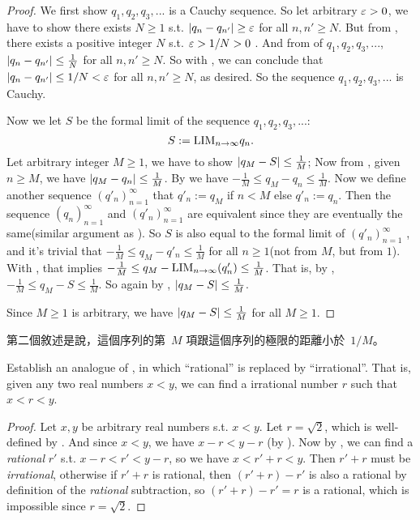 \begin{proof}
We first show \(q_1, q_2, q_3,...\) is a Cauchy sequence.
So let arbitrary \(\varepsilon > 0\), we have to show there exists \(N \ge 1\) s.t. \(\lvert q_n - q_{n'}\rvert \ge \varepsilon\) for all \(n, n' \ge N\).
But from , there exists a positive integer \(N\) s.t. \(\varepsilon > 1/N > 0\) .
And from  of \(q_1, q_2, q_3,...\), \(\lvert q_n - q_{n'}\rvert \le \frac{1}{N}\)  for all \(n, n' \ge N\).
So with , we can conclude that \(\lvert q_n - q_{n'}\rvert \le 1/N < \varepsilon\) for all \(n, n' \ge N\), as desired.
So the sequence \(q_1, q_2, q_3,...\) is Cauchy.

Now we let \(S\) be the formal limit of the sequence \(q_1, q_2, q_3,...\):
\[
    S := \text{LIM}_{n \to \infty} q_n.
\]
Let arbitrary integer \(M \ge 1\), we have to show \(\lvert q_M - S\rvert \le \frac{1}{M}\);
Now from , given \(n \ge M\), we have \(\lvert q_M - q_n\rvert \le \frac{1}{M}\).
By  we have \(-\frac{1}{M} \le q_M - q_n \le \frac{1}{M}\).
Now we define another sequence \((q'_n)_{n = 1}^{\infty}\) that \(q'_n := q_M\) if \(n < M\) else \(q'_n := q_n\).
Then the sequence \((q_n)_{n = 1}^{\infty}\) and \((q'_n)_{n = 1}^{\infty}\) are equivalent since they are eventually the same(similar argument as ).
So \(S\) is also equal to the formal limit of \((q'_n)_{n = 1}^{\infty}\) , and it's trivial that \(-\frac{1}{M} \le q_M - q'_n \le \frac{1}{M}\) for all \(n \ge 1\)(not from \(M\), but from \(1\)).
With , that implies \(-\frac{1}{M} \le q_M - \text{LIM}_{n \to \infty} (q'_n) \le \frac{1}{M}\).
That is, by , \(-\frac{1}{M} \le q_M - S \le \frac{1}{M}\).
So again by , \(\lvert q_M - S\rvert \le \frac{1}{M}\).

Since \(M \ge 1\) is arbitrary, we have \(\lvert q_M - S\rvert \le \frac{1}{M}\) for all \(M \ge 1\).
\end{proof}

\begin{note}
第二個敘述是說，這個序列的第\ \(M\) 項跟這個序列的極限的距離小於\ \(1/M\)。
\end{note}

\begin{exercise} \label{exercise 5.5.5}
Establish an analogue of , in which ``rational'' is replaced by ``irrational''.
That is, given any two real numbers \(x < y\), we can find a irrational number \(r\) such that \(x < r < y\).
\end{exercise}

\begin{proof}
Let \(x, y\) be arbitrary real numbers s.t. \(x < y\).
Let \(r = \sqrt{2}\), which is well-defined by .
And since \(x < y\), we have \(x - r < y - r\) (by ).
Now by , we can find a \emph{rational} \(r'\) s.t. \(x - r < r' < y - r\), so we have \(x < r' + r < y\).
Then \(r' + r\) must be \emph{irrational}, otherwise if \(r' + r\) is rational, then \((r' + r) - r'\) is also a rational by definition of the \emph{rational} subtraction, so \((r' + r) - r' = r\) is a rational, which is impossible since \(r = \sqrt{2}\). 
\end{proof}
